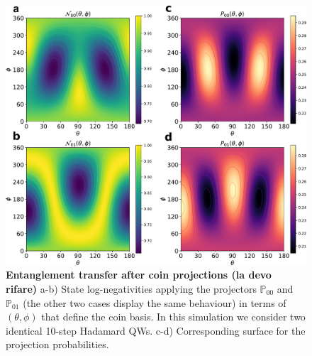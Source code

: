 \documentclass[
	aps, pra,
	superscriptaddress, twocolumn,
	floatfix,
	10pt
]{revtex4-1}
\newcommand{\PP}{\mathbb{P}}
\begin{document}

\begin{figure}[t!]
    \centering
    \includegraphics[width=\columnwidth]{NP10steps.pdf}
    \caption{\textbf{Entanglement transfer after coin projections (la devo rifare)} a-b) State log-negativities applying the projectors $\PP_{00}$ and $\PP_{01}$ (the other two cases display the same behaviour) in terms of $(\theta, \phi)$ that define the coin basis. In this simulation we consider two identical 10-step Hadamard QWs. c-d) Corresponding surface for the projection probabilities.}
    \label{fig:10steps_results}
\end{figure}
\end{document}
